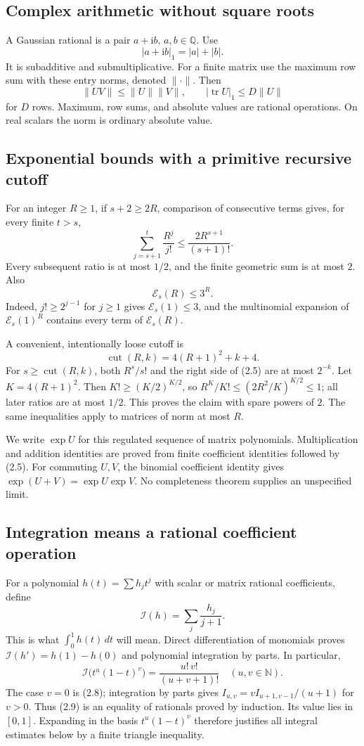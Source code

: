 \documentclass[11pt]{article}
\theoremstyle{definition}
\newcommand{\N}{\mathbb N}
\newcommand{\Q}{\mathbb Q}
\newcommand{\ii}{\mathrm i}
\newcommand{\tr}{\operatorname{tr}}
\newcommand{\Exp}{\mathcal E}
\newcommand{\FPint}{\mathcal I}
\newcommand{\cut}{\operatorname{cut}}
\begin{document}
\subsection{Complex arithmetic without square roots}

A Gaussian rational is a pair \(a+\ii b\), \(a,b\in\Q\). Use
\[
 |a+\ii b|_1=|a|+|b|.
\]
It is subadditive and submultiplicative. For a finite matrix use the maximum
row sum with these entry norms, denoted \(\|\cdot\|\).
Then
\[
 \|UV\|\le\|U\|\|V\|,\qquad |\tr U|_1\le D\|U\|
 \tag{2.4}
\]
for \(D\) rows. Maximum, row sums, and absolute values are rational
operations. On real scalars the norm is ordinary absolute value.

\subsection{Exponential bounds with a primitive recursive cutoff}

For an integer \(R\ge1\), if \(s+2\ge2R\), comparison of consecutive
terms gives, for every finite \(t>s\),
\[
 \sum_{j=s+1}^t\frac{R^j}{j!}
 \le \frac{2R^{s+1}}{(s+1)!}.
 \tag{2.5}
\]
Every subsequent ratio is at most \(1/2\), and the finite
geometric sum is at most \(2\). Also
\[
 \Exp_s(R)\le3^R. \tag{2.6}
\]
Indeed, \(j!\ge2^{j-1}\) for \(j\ge1\) gives
\(\Exp_s(1)\le3\), and the multinomial expansion of
\(\Exp_s(1)^R\) contains every term of \(\Exp_s(R)\).

A convenient, intentionally loose cutoff is
\[
 \cut(R,k)=4(R+1)^2+k+4. \tag{2.7}
\]
For \(s\ge\cut(R,k)\), both \(R^s/s!\) and the right side of (2.5)
are at most \(2^{-k}\). Let \(K=4(R+1)^2\).
Then \(K!\ge(K/2)^{K/2}\), so
\(R^K/K!\le(2R^2/K)^{K/2}\le1\); all later ratios are at most
\(1/2\). This proves the claim with spare powers of \(2\).
The same inequalities apply to matrices of norm at most \(R\).

We write \(\exp U\) for this regulated sequence of matrix polynomials.
Multiplication and addition identities are proved from finite coefficient
identities followed by (2.5). For commuting \(U,V\), the binomial
coefficient identity gives \(\exp(U+V)=\exp U\exp V\).
No completeness theorem supplies an unspecified limit.

\subsection{Integration means a rational coefficient operation}

For a polynomial \(h(t)=\sum h_jt^j\) with scalar or matrix rational
coefficients, define
\[
 \FPint(h)=\sum_j\frac{h_j}{j+1}.
 \tag{2.8}
\]
This is what \(\int_0^1h(t)\,dt\) will mean. Direct differentiation of
monomials proves
\(\FPint(h')=h(1)-h(0)\) and polynomial integration by parts.
In particular,
\[
 \FPint\bigl(t^u(1-t)^v\bigr)=\frac{u!\,v!}{(u+v+1)!}
 \quad(u,v\in\N).
 \tag{2.9}
\]
The case \(v=0\) is (2.8); integration by parts gives
\(I_{u,v}=vI_{u+1,v-1}/(u+1)\) for \(v>0\).
Thus (2.9) is an equality of rationals proved by induction.
Its value lies in \([0,1]\). Expanding in the basis
\(t^u(1-t)^v\) therefore justifies all integral estimates below by a
finite triangle inequality.
\end{document}
